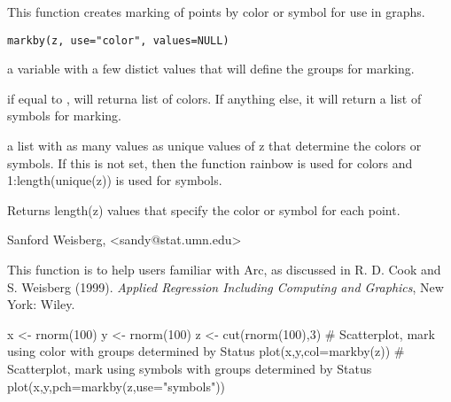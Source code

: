 \documentclass[letterpaper]{book}
\begin{document}
\begin{Description}\relax
This function creates marking of points by color or symbol for use in graphs.\end{Description}
\begin{Usage}
\begin{verbatim}
markby(z, use="color", values=NULL)
\end{verbatim}
\end{Usage}
\begin{Arguments}
\begin{ldescription}
\item[\code{z}] a variable with a few distict values that will define the groups for
marking.
\item[\code{use}] if equal to , will returna list of colors.  If
anything else, it will return a list of symbols for marking.
\item[\code{values}] a list with as many values as unique values of z that determine
the colors or symbols.  If this is not set, then the function rainbow is used
for colors and 1:length(unique(z)) is used for symbols.
\end{ldescription}
\end{Arguments}
\begin{Value}
Returns length(z) values that specify the color or symbol for each point.\end{Value}
\begin{Author}\relax
Sanford Weisberg, <sandy@stat.umn.edu>\end{Author}
\begin{References}\relax
This function is to help users familiar with Arc, as discussed in
R. D. Cook and S. Weisberg (1999).  \emph{Applied Regression Including
Computing and Graphics}, New York:  Wiley.\end{References}
\begin{Examples}
\begin{ExampleCode}
  x <- rnorm(100)
  y <- rnorm(100)
  z <- cut(rnorm(100),3)
# Scatterplot, mark using color with groups determined by Status
  plot(x,y,col=markby(z))
# Scatterplot, mark using symbols with groups determined by Status
  plot(x,y,pch=markby(z,use="symbols"))
\end{ExampleCode}
\end{Examples}
\end{document}
